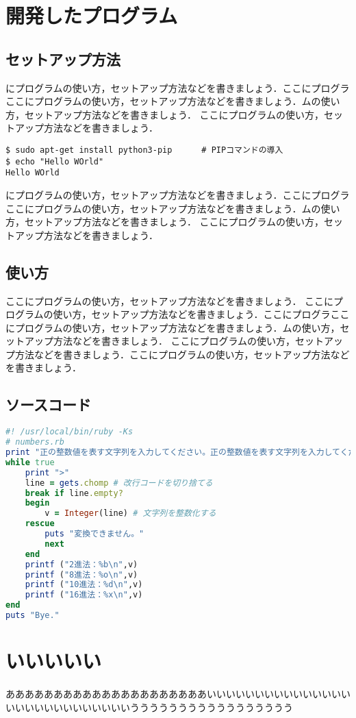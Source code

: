 
\appendix %
\chapter{開発したプログラム}
\section{セットアップ方法}


にプログラムの使い方，セットアップ方法などを書きましょう．ここにプログラここにプログラムの使い方，セットアップ方法などを書きましょう．ムの使い方，セットアップ方法などを書きましょう．
ここにプログラムの使い方，セットアップ方法などを書きましょう．

\begin{Verbatim}[frame=single]
$ sudo apt-get install python3-pip      # PIPコマンドの導入
$ echo "Hello WOrld"
Hello WOrld
\end{Verbatim}

にプログラムの使い方，セットアップ方法などを書きましょう．ここにプログラここにプログラムの使い方，セットアップ方法などを書きましょう．ムの使い方，セットアップ方法などを書きましょう．
ここにプログラムの使い方，セットアップ方法などを書きましょう．

\section{使い方}
ここにプログラムの使い方，セットアップ方法などを書きましょう．
ここにプログラムの使い方，セットアップ方法などを書きましょう．ここにプログラここにプログラムの使い方，セットアップ方法などを書きましょう．ムの使い方，セットアップ方法などを書きましょう．
ここにプログラムの使い方，セットアップ方法などを書きましょう．ここにプログラムの使い方，セットアップ方法などを書きましょう．

\section{ソースコード}


\begin{lstlisting}[language=ruby,caption=スパゲッティソース,label=test.rb]
#! /usr/local/bin/ruby -Ks
# numbers.rb
print "正の整数値を表す文字列を入力してください。正の整数値を表す文字列を入力してください。\n"
while true
	print ">"
	line = gets.chomp # 改行コードを切り捨てる
	break if line.empty?
	begin
		v = Integer(line) # 文字列を整数化する
	rescue
		puts "変換できません。"
		next
	end
	printf ("2進法：%b\n",v)
	printf ("8進法：%o\n",v)
	printf ("10進法：%d\n",v)
	printf ("16進法：%x\n",v)
end
puts "Bye."
\end{lstlisting}
\chapter{いいいいい}
あああああああああああああああああああああいいいいいいいいいいいいいいいいいいいいいいいいいいいいううううううううううううううううう
